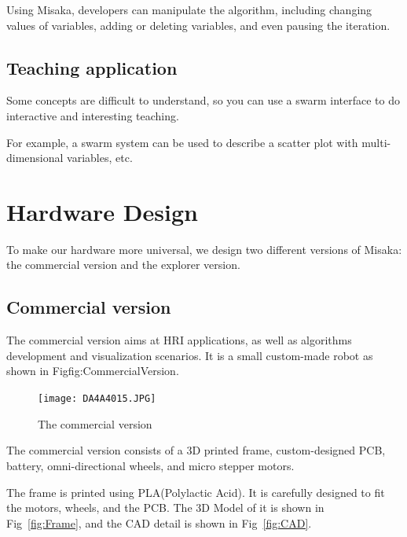 \documentclass[sigconf]{acmart}
\begin{document}
Using Misaka, developers can manipulate the algorithm, including changing values of variables, adding or deleting variables, and even pausing the iteration.

\subsection{Teaching application}

Some concepts are difficult to understand, so you can use a swarm interface to do interactive and interesting teaching.

For example, a swarm system can be used to describe a scatter plot with multi-dimensional variables, etc.






\section{Hardware Design}

To make our hardware more universal, we design two different versions of Misaka: the commercial version and the explorer version.

\subsection{Commercial version}

The commercial version aims at HRI applications, as well as algorithms development and visualization scenarios. It is a small custom-made robot as shown in Fig{fig:CommercialVersion}.

\begin{figure}[h]
  \centering
  \texttt{[image: DA4A4015.JPG]}
  \caption{The commercial version}
  \label{fig:CommercialVersion}
\end{figure}

The commercial version consists of a 3D printed frame, custom-designed PCB, battery, omni-directional wheels, and micro stepper motors.

The frame is printed using PLA(Polylactic Acid). It is carefully designed to fit the motors, wheels, and the PCB. The 3D Model of it is shown in Fig~\ref{fig:Frame}, and the CAD detail is shown in Fig~\ref{fig:CAD}.
\end{document}

